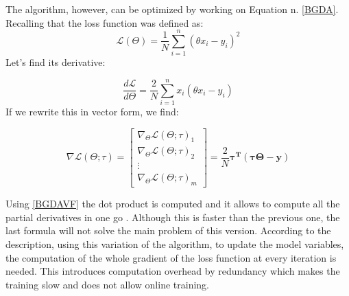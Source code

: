 \documentclass[conference]{IEEEtran}
\begin{document}
The algorithm, however, can be optimized by working on Equation n. \ref{BGDA}.
Recalling that the loss function was defined as:
\[
\mathscr{L}(\Theta)= \frac{1}{N}\sum_{i=1}^{n}(\theta x_i - y_i)^2
\]
Let's find its derivative:

\[
\frac{d\mathscr{L}}{d\Theta} = \frac{2}{N}\sum_{i=1}^{n}x_i(\theta x_i - y_i)
\]
If we rewrite this in vector form, we find:

\begin{equation}
   \nabla\mathscr{L}(\Theta;\tau) = \begin{bmatrix}
            \nabla_{\Theta}\mathscr{L}(\Theta;\tau)_{1} \\
            \nabla_{\Theta}\mathscr{L}(\Theta;\tau)_{2} \\
           \vdots \\
            \nabla_{\Theta}\mathscr{L}(\Theta;\tau)_{m}
         \end{bmatrix} =  \frac{2}{N}\mathbf{\tau^{T}}(\mathbf{\tau\Theta}-\mathbf{y})
         \label{BGDAVF}
\end{equation}

Using \eqref{BGDAVF} the dot product is computed and it allows to compute all the partial derivatives in one go \cite{Scikit-Learn}.
Although this is faster than the previous one, the last formula will not solve the main problem of this version.
According to the description, using this variation of the algorithm, to update the model variables, the computation of the whole gradient of the loss function at every iteration is needed. This introduces computation overhead by redundancy which makes the training slow and does not allow online training. 
\end{document}
